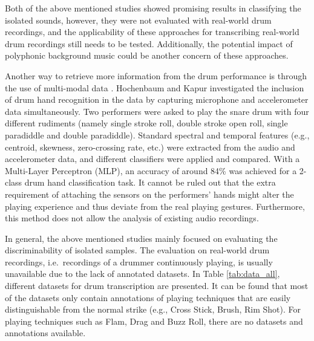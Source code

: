 \documentclass{article}
\begin{document}
Both of the above mentioned studies showed promising results in classifying the isolated sounds, however, they were not evaluated with real-world drum recordings, and the applicability of these approaches for transcribing real-world drum recordings still needs to be tested. Additionally, the potential impact of polyphonic background music could be another concern of these approaches. 
 
Another way to retrieve more information from the drum performance is through the use of multi-modal data \cite{Hochenbaum2011}. Hochenbaum and Kapur investigated the inclusion of drum hand recognition in the data by capturing microphone and accelerometer data simultaneously. Two performers were asked to play the snare drum with four different rudiments (namely single stroke roll, double stroke open roll, single paradiddle and double paradiddle). Standard spectral and temporal features (e.g., centroid, skewness, zero-crossing rate, etc.) were extracted from the audio and accelerometer data, and different classifiers were applied and compared. With a Multi-Layer Perceptron (MLP), an accuracy of around 84\% was achieved for a 2-class drum hand classification task. It cannot be ruled out that the extra requirement of attaching the sensors on the performers' hands might alter the playing experience and thus deviate from the real playing gestures. Furthermore, this method does not allow the analysis of existing audio recordings. 

In general, the above mentioned studies mainly focused on evaluating the discriminability of isolated samples. The evaluation on real-world drum recordings, i.e.\ recordings of a drummer continuously playing, is usually unavailable due to the lack of annotated datasets. In Table \ref{tab:data_all}, different datasets for drum transcription are presented. It can be found that most of the datasets only contain annotations of playing techniques that are easily distinguishable from the normal strike (e.g., Cross Stick, Brush, Rim Shot). For playing techniques such as Flam, Drag and Buzz Roll, there are no datasets and annotations available. 

\end{document}
